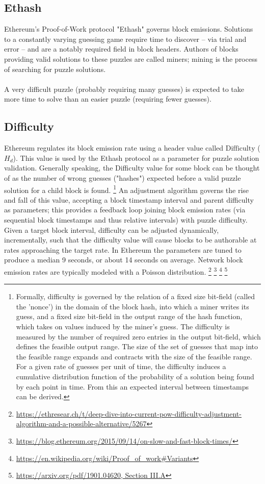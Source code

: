 \documentclass[11pt]{article}
\theoremstyle{plain}
\begin{document}
\subsection{\small{Ethash}}

Ethereum's Proof-of-Work protocol "Ethash" governs block emissions. Solutions
to a constantly varying guessing game require time to discover -- via trial and
error -- and are a notably required field in block headers. Authors of blocks
providing valid solutions to these puzzles are called miners; mining is the
process of searching for puzzle solutions. \\
\\
A very difficult puzzle (probably requiring many guesses) is expected to take 
more time to solve than an easier puzzle (requiring fewer guesses).

\subsection{\small{Difficulty}}
Ethereum regulates its block emission rate using a header value called
$\mathrm{Difficulty}$ ($H_d$). This value is used by the Ethash protocol as a
parameter for puzzle solution validation. Generally speaking, the Difficulty
value for some block can be thought of as the number of wrong guesses
("hashes") expected before a valid puzzle solution for a child block is
found.\nolinebreak
\footnote{Formally, difficulty is governed by the relation of a fixed size
bit-field (called the 'nonce') in the domain of the block hash, into which a 
miner writes its guess, and a fixed size bit-field in the output range of the 
hash function, which takes on values induced by the miner's guess. The 
difficulty is measured by the number of required zero entries in the output  
bit-field, which defines the feasible output range.  The size of the set of 
guesses that map into the feasible range expands and contracts with the size of 
the feasible range. For a given rate of guesses per unit of time, the 
difficulty induces a cumulative distribution function of the probability of a 
solution being found by each point in time. From this an expected interval 
between timestamps can be derived.}
An adjustment algorithm governs the rise and fall of this value, accepting a 
block timestamp interval and parent difficulty as parameters;
this provides a feedback loop joining block emission rates (via sequential 
block timestamps and thus relative intervals) with puzzle difficulty.
Given a target block interval, difficulty can be adjusted dynamically, 
incrementally, such that the difficulty value will cause blocks to be authorable
at rates approaching the target rate.
In Ethereum the parameters are tuned to produce a median 9 seconds, or about 14
seconds on average.
Network block emission rates are typically modeled with a Poisson
distribution.\nolinebreak
\footnote{\url{https://ethresear.ch/t/deep-dive-into-current-pow-difficulty-adjustment-algorithm-and-a-possible-alternative/5267}}\nolinebreak
\footnote{\url{https://blog.ethereum.org/2015/09/14/on-slow-and-fast-block-times/}}\nolinebreak
\footnote{\url{https://en.wikipedia.org/wiki/Proof_of_work#Variants}}\nolinebreak
\footnote{\url{https://arxiv.org/pdf/1901.04620, Section III.A}}
\end{document}
